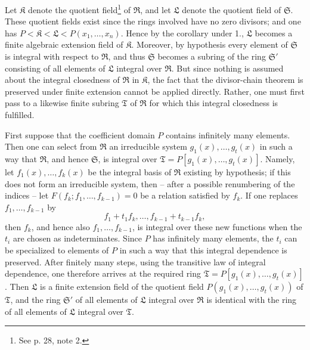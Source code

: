 Let $\mathfrak K$ denote the quotient field\footnote{See p. 28, note 2.} of $\mathfrak R$, and let $\mathfrak L$ denote the quotient field of $\mathfrak S$. These quotient fields exist since the rings involved have no zero divisors; and one has $P<\mathfrak K<\mathfrak L<P(x_1,\ldots,x_n)$. Hence by the corollary under 1., $\mathfrak L$ becomes a finite algebraic extension field of $\mathfrak K$. Moreover, by hypothesis every element of $\mathfrak S$ is integral with respect to $\mathfrak R$, and thus $\mathfrak S$ becomes a subring of the ring $\mathfrak S'$ consisting of all elements of $\mathfrak L$ integral over $\mathfrak R$. But since nothing is assumed about the integral closedness of $\mathfrak R$ in $\mathfrak K$, the fact that the divisor-chain theorem is preserved under finite extension cannot be applied directly. Rather, one must first pass to a likewise finite subring $\mathfrak T$ of $\mathfrak R$ for which this integral closedness is fulfilled.

First suppose that the coefficient domain $P$ contains infinitely many elements. Then one can select from $\mathfrak R$ an irreducible system $g_1(x),\ldots,g_t(x)$ in such a way that $\mathfrak R$, and hence $\mathfrak S$, is integral over $\mathfrak T=P[g_1(x),\ldots,g_t(x)]$. Namely, let $f_1(x),\ldots,f_k(x)$ be the integral basis of $\mathfrak R$ existing by hypothesis; if this does not form an irreducible system, then -- after a possible renumbering of the indices -- let $F(f_k;f_1,
\ldots,f_{k-1})=0$ be a relation satisfied by $f_k$. If one replaces $f_1,
\ldots,f_{k-1}$ by
\[
 f_1+t_1f_k,\ldots,f_{k-1}+t_{k-1}f_k,
\]
then $f_k$, and hence also $f_1,
\ldots,f_{k-1}$, is integral over these new functions when the $t_i$ are chosen as indeterminates. Since $P$ has infinitely many elements, the $t_i$ can be specialized to elements of $P$ in such a way that this integral dependence is preserved. After finitely many steps, using the transitive law of integral dependence, one therefore arrives at the required ring $\mathfrak T=P[g_1(x),\ldots,g_t(x)]$. Then $\mathfrak L$ is a finite extension field of the quotient field $P(g_1(x),\ldots,g_t(x))$ of $\mathfrak T$, and the ring $\mathfrak S'$ of all elements of $\mathfrak L$ integral over $\mathfrak R$ is identical with the ring of all elements of $\mathfrak L$ integral over $\mathfrak T$.

